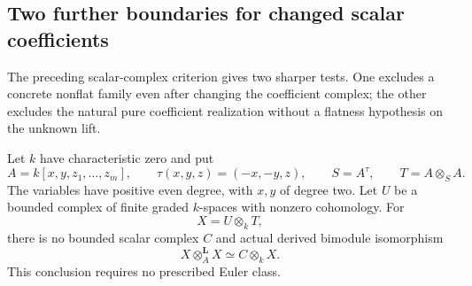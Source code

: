 \subsection{Two further boundaries for changed scalar coefficients}

The preceding scalar-complex criterion gives two sharper
tests. One excludes a concrete nonflat family even after
changing the coefficient complex; the other excludes the
natural pure coefficient realization without a flatness
hypothesis on the unknown lift.

\begin{finding}
\label{f:scalarInvariantFactorNoGo}
Let \(k\) have characteristic zero and put
\[
 A=k[x,y,z_1,\ldots,z_m],\qquad
 \tau(x,y,z)=(-x,-y,z),\qquad
 S=A^\tau,\qquad T=A\otimes_S A.
\]
The variables have positive even degree, with \(x,y\)
of degree two. Let \(U\) be a bounded complex of finite
graded \(k\)-spaces with nonzero cohomology. For
\[
                         X=U\otimes_kT,
\]
there is no bounded scalar complex \(C\) and actual
derived bimodule isomorphism
\begin{equation}\label{eq:scalarInvariantChangedQuadratic}
                 X\otimes_A^{\mathbf L}X\simeq C\otimes_kX.
\end{equation}
This conclusion requires no prescribed Euler class.
\end{finding}

